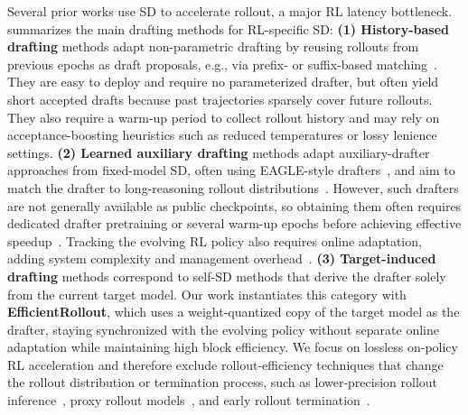 \documentclass{llmxive}
\providecommand{\methodtitle}{EfficientRollout}
\providecommand{\History}{History-based drafting}
\providecommand{\Learned}{Learned auxiliary drafting}
\providecommand{\TargetInduced}{Target-induced drafting}
\providecommand{\nonparametric}{non-parametric drafting}
\providecommand{\bottleneck}{latency bottleneck}
\providecommand{\mj}[1]{}
\begin{document}
Several prior works use SD to accelerate rollout, a major RL \bottleneck{}.
 summarizes the main drafting methods for RL-specific SD:
\textbf{(1) \History{}} methods adapt \nonparametric{} by reusing rollouts from previous epochs as draft proposals, e.g., via prefix- or suffix-based matching~\citep{liu2025spec,he2025history,shao2025beat}.
They are easy to deploy and require no parameterized drafter, but often yield short accepted drafts because past trajectories sparsely cover future rollouts. They also require a warm-up period to collect rollout history and may rely on acceptance-boosting heuristics such as reduced temperatures or lossy lenience settings.
\textbf{(2) \Learned{}} methods adapt auxiliary-drafter approaches from fixed-model SD, often using EAGLE-style drafters~\citep{li2024eagle,li2025eagle}, and aim to match the drafter to long-reasoning rollout distributions~\citep{zhang2025fastgrpo,chen2025respec,hu2026taming,iso2026accelerating}.
However, such drafters are not generally available as public checkpoints, so obtaining them often requires dedicated drafter pretraining or several warm-up epochs before achieving effective speedup~\citep{zhang2025fastgrpo}.
Tracking the evolving RL policy also requires online adaptation, adding system complexity and management overhead~\citep{hu2026taming}.
\textbf{(3) \TargetInduced{}} methods correspond to self-SD methods that derive the drafter solely from the current target model.
Our work instantiates this category with \textbf{\methodtitle{}}, which uses a weight-quantized copy of the target model as the drafter, staying synchronized with the evolving policy without separate online adaptation while maintaining high block efficiency.
We focus on lossless on-policy RL acceleration and therefore exclude rollout-efficiency techniques that change the rollout distribution or termination process, such as lower-precision rollout inference~\citep{li2026qurl}, proxy rollout models~\citep{chen2026jackpot}, and early rollout termination~\citep{zhang2026sortedrl,zhou2025april}.

\end{document}
